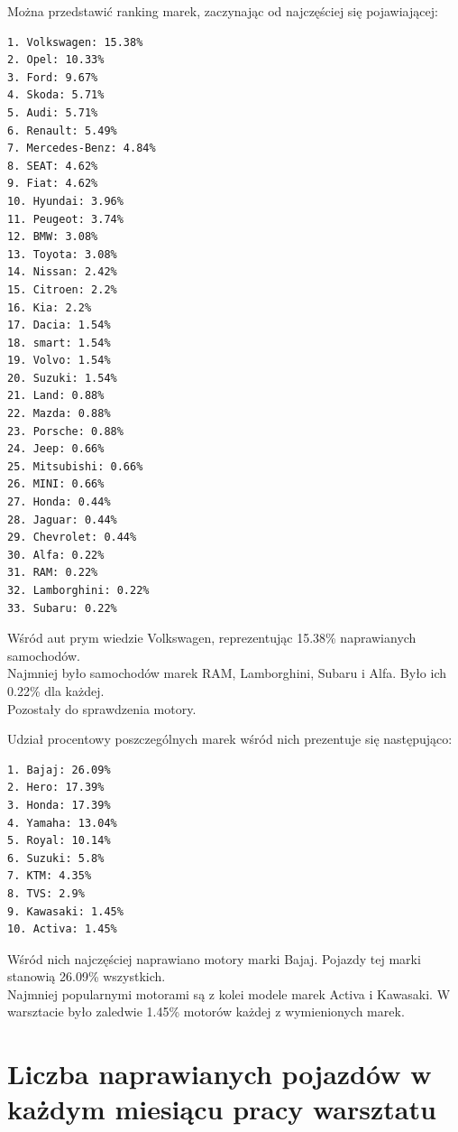 \documentclass{article}\usepackage[]{graphicx}\usepackage[]{xcolor}
\begin{document}
Można przedstawić ranking marek, zaczynając od najczęściej się pojawiającej:

\begin{verbatim}
1. Volkswagen: 15.38%
2. Opel: 10.33%
3. Ford: 9.67%
4. Skoda: 5.71%
5. Audi: 5.71%
6. Renault: 5.49%
7. Mercedes-Benz: 4.84%
8. SEAT: 4.62%
9. Fiat: 4.62%
10. Hyundai: 3.96%
11. Peugeot: 3.74%
12. BMW: 3.08%
13. Toyota: 3.08%
14. Nissan: 2.42%
15. Citroen: 2.2%
16. Kia: 2.2%
17. Dacia: 1.54%
18. smart: 1.54%
19. Volvo: 1.54%
20. Suzuki: 1.54%
21. Land: 0.88%
22. Mazda: 0.88%
23. Porsche: 0.88%
24. Jeep: 0.66%
25. Mitsubishi: 0.66%
26. MINI: 0.66%
27. Honda: 0.44%
28. Jaguar: 0.44%
29. Chevrolet: 0.44%
30. Alfa: 0.22%
31. RAM: 0.22%
32. Lamborghini: 0.22%
33. Subaru: 0.22%
\end{verbatim}

Wśród aut prym wiedzie Volkswagen, reprezentując  15.38\% naprawianych samochodów. \\

Najmniej było samochodów marek RAM, Lamborghini, Subaru i Alfa. Było ich 0.22\% dla każdej. \\

Pozostały do sprawdzenia motory.



Udział procentowy poszczególnych marek wśród nich prezentuje się następująco:

\begin{verbatim}
1. Bajaj: 26.09%
2. Hero: 17.39%
3. Honda: 17.39%
4. Yamaha: 13.04%
5. Royal: 10.14%
6. Suzuki: 5.8%
7. KTM: 4.35%
8. TVS: 2.9%
9. Kawasaki: 1.45%
10. Activa: 1.45%
\end{verbatim}

Wśród nich najczęściej naprawiano motory marki Bajaj. Pojazdy tej marki stanowią 26.09\% wszystkich. \\

Najmniej popularnymi motorami są z kolei modele marek Activa i Kawasaki. W warsztacie było zaledwie 1.45\% motorów każdej z wymienionych marek.

\section{Liczba naprawianych pojazdów w każdym miesiącu pracy warsztatu}
\end{document}
